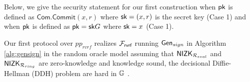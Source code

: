 Below, we give the security statement for our first construction when $ \mathsf{pk} $ is defined as $ \mathsf{Com}.\mathsf{Commit}(x,r) $ where $ \mathsf{sk} = (x, r) $ is the secret key (Case 1) and  when $ \mathsf{pk} $ is defined as $ \mathsf{pk} = \mathsf{sk}G $ where $ \mathsf{sk} = x $  (Case 1).
\begin{theorem}\label{thm:firstprotocol}
	Our first protocol over  $ pp_{rvrf} $ realizes \cite{canetti1,canetti2}  $ \mathcal{F}_{\textsf{rvrf}} $ running $ \mathsf{Gen}_{sign} $ in Algorithm \ref{alg:gensign} in the random oracle model assuming that $ {\mathsf{NIZK}}_{\mathcal{R}_{eval}} $ and $ {\mathsf{NIZK}}_{\mathcal{R}_{ring}}$ are zero-knowledge and knowledge sound, the decisional Diffie-Hellman (DDH) problem are hard in $ {\mathbb{G}}  $ . 
\end{theorem}

